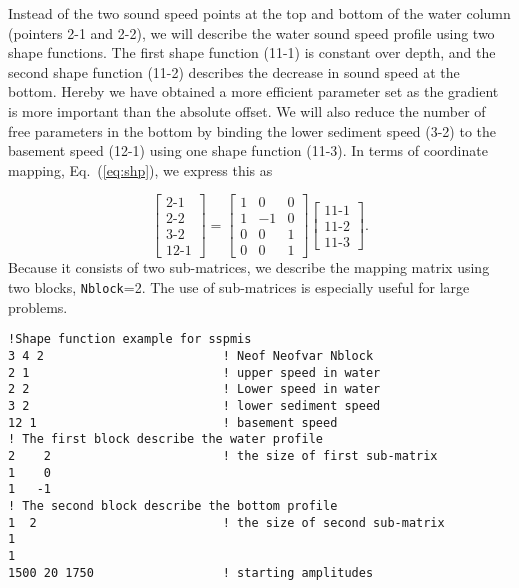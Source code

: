 \documentclass{saclantc}
\begin{document}
Instead of the two sound speed points at the top and
bottom of the water column (pointers 2-1 and 2-2),
we will describe the water sound speed profile
using two shape functions.
The first shape function (11-1) is constant
over depth, and the second shape
function (11-2) describes the decrease in sound speed at the bottom.
Hereby we have obtained a more efficient
parameter set as the gradient is  more important than the absolute offset.
We will also reduce the number of free parameters in the bottom by
binding the lower sediment speed (3-2) to the basement speed (12-1) using
one shape function (11-3). In terms of coordinate
mapping, Eq.\ (\ref{eq:shp}), we express this as



\begin{equation}
\left[ \begin{array}{c} \mbox{2-1} \\  \mbox{2-2} \\ 
           \mbox{3-2} \\   \mbox{12-1} \end{array} \right]
=
\left[ \begin{array}{ccc} 1 & 0 & 0\\ 1 & -1 & 0\\
                                 0 & 0 & 1\\ 0 & 0 & 1\end{array} \right]
\left[ \begin{array}{c}\mbox{11-1} \\ \mbox{11-2} \\ \mbox{11-3} \end{array} \right].
\end{equation}
Because it consists of two sub-matrices, we  describe 
the mapping matrix using two blocks, {\tt Nblock}=2. The
use of sub-matrices is especially useful for large problems.

\clearpage
\small
\begin{verbatim}
!Shape function example for sspmis
3 4 2                         ! Neof Neofvar Nblock
2 1                           ! upper speed in water
2 2                           ! Lower speed in water
3 2                           ! lower sediment speed
12 1                          ! basement speed
! The first block describe the water profile
2    2                        ! the size of first sub-matrix
1    0
1   -1
! The second block describe the bottom profile
1  2                          ! the size of second sub-matrix
1
1
1500 20 1750                  ! starting amplitudes
\end{verbatim}
\normalsize
\end{document}
